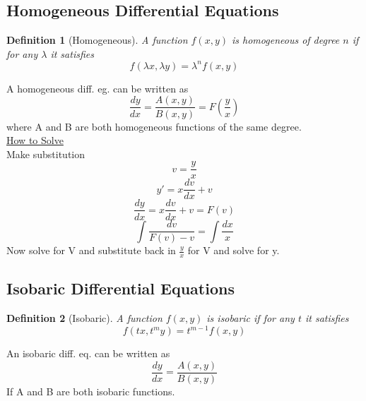 \documentclass[12pt]{article}
\newtheorem{definition}{Definition}[section]
\numberwithin{equation}{subsection}
\newcommand{\derx}[1]{\frac{d #1}{dx}}
\newcommand{\deryx}{\frac{dy}{dx}}
\newcommand{\inda}{\hspace{.5cm}}
\newcommand{\indb}{\hspace{1cm}}
\begin{document}
\newpage
\subsection{Homogeneous Differential Equations}
\theoremstyle{definition}
\begin{definition}[Homogeneous]
A function $f(x,y)$ is homogeneous of degree $n$ if for any $\lambda$ it satisfies 
\begin{equation}
f(\lambda x, \lambda y)=\lambda^{n} f(x,y)
\end{equation}
\end{definition}

A homogeneous diff. eg. can be written as
\begin{equation}
\deryx = \frac{A(x,y)}{B(x,y)}= F\left(\frac{y}{x}\right)
\end{equation}
\inda where A and B are both homogeneous functions of the same degree.\\

\noindent \underline{How to Solve}\\

Make substitution
\begin{equation}
v=\frac{y}{x}
\end{equation}
\begin{equation}
y'=x\derx{v}+v
\end{equation}
\begin{equation}
\deryx = x\derx{v}+v = F(v)
\end{equation}
\begin{equation}
\int \frac{dv}{F(v)-v}= \int \frac{dx}{x}
\end{equation}
\indb Now solve for V and substitute back in $\frac{y}{x}$ for V and solve for y.

\subsection{Isobaric Differential Equations}
\theoremstyle{definition}
\begin{definition}[Isobaric]
A function $f(x,y)$ is isobaric if for any $t$ it satisfies 
\begin{equation}
f(t x, t^m y)=t^{m-1} f(x,y)
\end{equation}
\end{definition}

An isobaric diff. eq. can be written as 
\begin{equation}
\deryx = \frac{A(x,y)}{B(x,y)}
\end{equation}
\inda If A and B are both isobaric functions.\\
\end{document}

